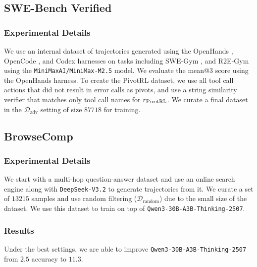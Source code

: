 \subsection{SWE-Bench Verified}
\subsubsection{Experimental Details}
We use an internal dataset of trajectories generated using the OpenHands \citep{wang2025openhandsopenplatformai}, OpenCode \citep{opencode}, and Codex \citep{openaicodex_software} harnesses on tasks including SWE-Gym \citep{pan2025trainingsoftwareengineeringagents}, and R2E-Gym \citep{jain2025r2egymproceduralenvironmentshybrid} using the \texttt{MiniMaxAI/MiniMax-M2.5} \citep{minimax2026m25} model. We evaluate the mean@3 score using the OpenHands harness. To create the PivotRL dataset, we use all tool call actions that did not result in error calls as pivots, and use a string similarity verifier that matches only tool call names for $r_{\name}$. We curate a final dataset in the $\mathcal{D}_{\text{adv}}$ setting of size $87718$ for training.


\subsection{BrowseComp}
\subsubsection{Experimental Details}
We start with a multi-hop question-answer dataset and use an online search engine along with \texttt{DeepSeek-V3.2} to generate trajectories from it. We curate a set of $13215$ samples and use random filtering ($\mathcal{D}_{\text{random}}$) due to the small size of the dataset. We use this dataset to train on top of \texttt{Qwen3-30B-A3B-Thinking-2507}.
\subsubsection{Results}
Under the best settings, we are able to improve \texttt{Qwen3-30B-A3B-Thinking-2507} from $2.5$ accuracy to $11.3$.


